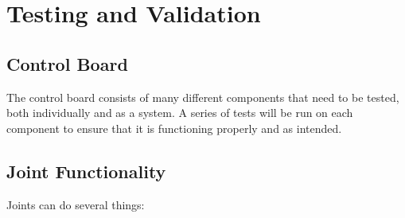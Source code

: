 \section{Testing and Validation}
\subsection{Control Board}
The control board consists of many different components that need to be tested, both individually and as a system. A series of tests will be run on each component to ensure that it is functioning properly and as intended. 
\subsection{Joint Functionality}

Joints can do several things:
